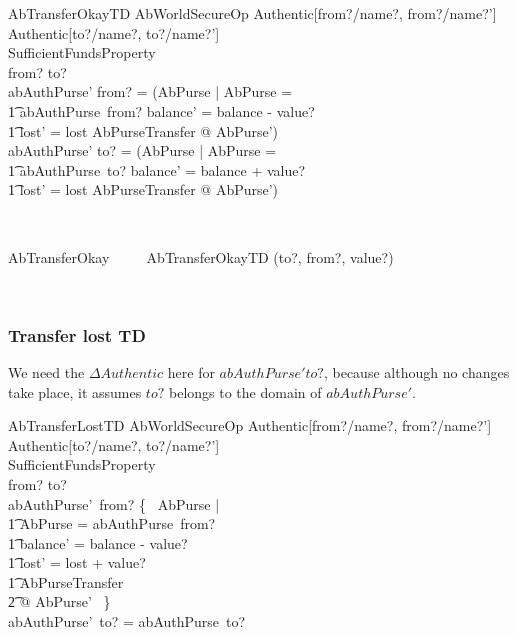 \begin{LSDef}
\begin{schema}{AbTransferOkayTD}
  AbWorldSecureOp
\where
  \Delta Authentic[from?/name?, from?/name?']\\
  \Delta Authentic[to?/name?, to?/name?']\\
  SufficientFundsProperty\\
  from? \neq to?\\
  abAuthPurse' from? = (\mu  \Delta AbPurse | \theta  AbPurse = \\
      \t1 abAuthPurse~from? \land  balance' = balance - value? \land \\
      \t1 lost' = lost \land  \Xi AbPurseTransfer @ \theta  AbPurse')\\
  abAuthPurse' to? = (\mu  \Delta AbPurse | \theta  AbPurse = \\
      \t1 abAuthPurse~to? \land  balance' = balance + value? \land  \\
      \t1 lost' = lost \land  \Xi AbPurseTransfer @ \theta  AbPurse')
\end{schema}~\end{LSDef}

\begin{LSDef}
\begin{zed}
   AbTransferOkay ~~~~ AbTransferOkayTD \hide (to?, from?, value?)
\end{zed}~\end{LSDef}

\subsubsection{Transfer lost TD}

We need the $\Delta Authentic$ here for $abAuthPurse' to?$,
because although no changes take place, it assumes $to?$ belongs
to the domain of $abAuthPurse'$.
%
\begin{LSDef}
\begin{schema}{AbTransferLostTD}
  AbWorldSecureOp
\where
  \Delta Authentic[from?/name?, from?/name?']\\
  \Delta Authentic[to?/name?, to?/name?']\\
  SufficientFundsProperty\\
  from? \neq to?\\
  abAuthPurse'~from? \in \{~ \Delta AbPurse | \\
      \t1 \theta AbPurse = abAuthPurse~from? \\
      \t1 \land balance' = balance - value? \\
      \t1 \land lost' = lost + value? \\
      \t1 \land \Xi AbPurseTransfer \\
      \t2 @ \theta AbPurse' ~\}\\
  abAuthPurse'~to? = abAuthPurse~to?
\end{schema}~\end{LSDef}

